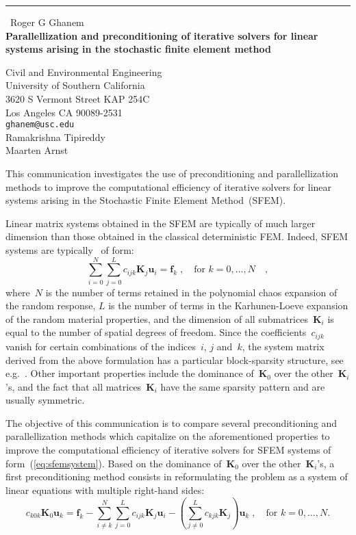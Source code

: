 \documentclass{report}
\begin{document}
\begin{center}
\rule{6in}{1pt} \
{\large Roger G Ghanem \\
{\bf Parallellization and preconditioning of iterative solvers for linear systems arising in the stochastic finite element method}}

Civil and Environmental Engineering \\ University of Southern California \\ 3620 S Vermont Street KAP 254C \\ Los Angeles CA 90089-2531
\\
{\tt ghanem@usc.edu}\\
Ramakrishna Tipireddy\\
Maarten Arnst\end{center}

This communication investigates the use of preconditioning and
parallellization methods to improve the computational efficiency of
iterative solvers for linear systems arising in the Stochastic Finite
Element Method~(SFEM).

Linear matrix systems obtained in the SFEM are typically of much larger
dimension than those obtained in the classical deterministic FEM. Indeed,
SFEM systems are typically~\cite{ghanem1991} of form:
\begin{equation}
\sum_{i=0}^{N}\sum_{j=0}^{L}c_{ijk}\boldsymbol{K}_{j}\boldsymbol{u}_{i}=\boldsymbol{f}_{k}\;,\quad\text{for~$k
= 0,\ldots,N$}\quad,\label{eq:sfemsystem}
\end{equation}
where~$N$ is the number of terms retained in the polynomial chaos
expansion of the random response, $L$ is the number of terms in the
Karhunen-Loeve expansion of the random material properties, and the
dimension of all submatrices~$\boldsymbol{K}_{i}$ is equal to the number
of spatial degrees of freedom. Since the coefficients~$c_{ijk}$ vanish
for certain combinations of the indices~$i$, $j$ and~$k$, the system
matrix derived from the above formulation has a particular block-sparsity
structure, see e.g.~\cite{pellisetti2000}. Other important properties
include the dominance of~$\boldsymbol{K}_0$ over the
other~$\boldsymbol{K}_i$'s, and the fact that all
matrices~$\boldsymbol{K}_i$ have the same sparsity pattern and are
usually symmetric.

The objective of this communication is to compare several preconditioning
and parallellization methods which capitalize on the aforementioned
properties to improve the computational efficiency of iterative solvers
for SFEM systems of form~(\ref{eq:sfemsystem}). Based on the dominance
of~$\boldsymbol{K}_0$ over the other~$\boldsymbol{K}_i$'s, a first
preconditioning method consists in reformulating the problem as a system
of linear equations with multiple right-hand sides:
\begin{equation}
c_{k0k}\boldsymbol{K}_{0}\boldsymbol{u}_{k}=\boldsymbol{f}_{k}-\sum_{i\not=k}^{N}\sum_{j=0}^{L}c_{ijk}\boldsymbol{K}_{j}\boldsymbol{u}_{i}-\left(\sum_{j\not=0}^{L}c_{kjk}\boldsymbol{K}_{j}\right)\boldsymbol{u}_{k}\;,\quad\text{for~$k
= 0,\ldots,N$}.
\end{equation}
\end{document}
